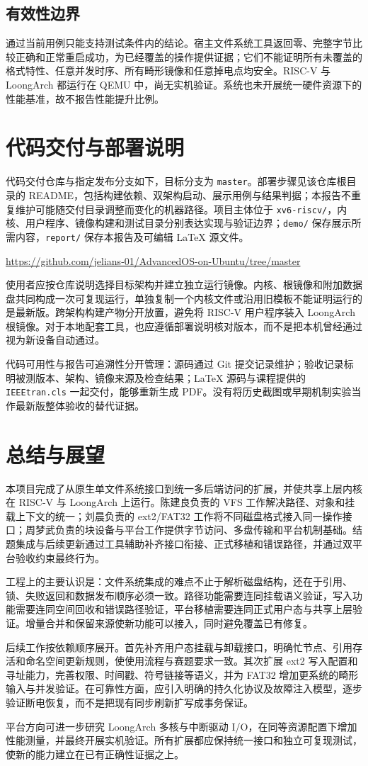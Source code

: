 \documentclass[conference]{IEEEtran}
\newcommand{\code}[1]{\texttt{#1}}
\begin{document}
\subsection{有效性边界}
通过当前用例只能支持测试条件内的结论。宿主文件系统工具返回零、完整字节比较正确和正常重启成功，为已经覆盖的操作提供证据；它们不能证明所有未覆盖的格式特性、任意并发时序、所有畸形镜像和任意掉电点均安全。RISC-V 与 LoongArch 都运行在 QEMU 中，尚无实机验证。系统也未开展统一硬件资源下的性能基准，故不报告性能提升比例。

\section{代码交付与部署说明}
代码交付仓库与指定发布分支如下，目标分支为 \code{master}。部署步骤见该仓库根目录的 README，包括构建依赖、双架构启动、展示用例与结果判据；本报告不重复维护可能随交付目录调整而变化的机器路径。项目主体位于 \code{xv6-riscv/}，内核、用户程序、镜像构建和测试目录分别表达实现与验证边界；\code{demo/} 保存展示所需内容，\code{report/} 保存本报告及可编辑 LaTeX 源文件。

\begin{center}
\small
\url{https://github.com/jelians-01/AdvancedOS-on-Ubuntu/tree/master}
\end{center}

使用者应按仓库说明选择目标架构并建立独立运行镜像。内核、根镜像和附加数据盘共同构成一次可复现运行，单独复制一个内核文件或沿用旧模板不能证明运行的是最新版。跨架构构建产物分开放置，避免将 RISC-V 用户程序装入 LoongArch 根镜像。对于本地配套工具，也应遵循部署说明核对版本，而不是把本机曾经通过视为新设备自动通过。

代码可用性与报告可追溯性分开管理：源码通过 Git 提交记录维护；验收记录标明被测版本、架构、镜像来源及检查结果；LaTeX 源码与课程提供的 \code{IEEEtran.cls} 一起交付，能够重新生成 PDF。没有将历史截图或早期机制实验当作最新版整体验收的替代证据。

\balance
\section{总结与展望}
本项目完成了从原生单文件系统接口到统一多后端访问的扩展，并使共享上层内核在 RISC-V 与 LoongArch 上运行。陈建良负责的 VFS 工作解决路径、对象和挂载上下文的统一；刘晨负责的 ext2/FAT32 工作将不同磁盘格式接入同一操作接口；周梦武负责的块设备与平台工作提供字节访问、多盘传输和平台机制基础。结题集成与后续更新通过工具辅助补齐接口衔接、正式移植和错误路径，并通过双平台验收约束最终行为。

工程上的主要认识是：文件系统集成的难点不止于解析磁盘结构，还在于引用、锁、失败返回和数据发布顺序必须一致。路径功能需要连同挂载语义验证，写入功能需要连同空间回收和错误路径验证，平台移植需要连同正式用户态与共享上层验证。增量合并和保留来源使新功能可以接入，同时避免覆盖已有修复。

后续工作按依赖顺序展开。首先补齐用户态挂载与卸载接口，明确忙节点、引用存活和命名空间更新规则，使使用流程与赛题要求一致。其次扩展 ext2 写入配置和寻址能力，完善权限、时间戳、符号链接等语义，并为 FAT32 增加更系统的畸形输入与并发验证。在可靠性方面，应引入明确的持久化协议及故障注入模型，逐步验证断电恢复，而不是把现有同步刷新扩写成事务保证。

平台方向可进一步研究 LoongArch 多核与中断驱动 I/O，在同等资源配置下增加性能测量，并最终开展实机验证。所有扩展都应保持统一接口和独立可复现测试，使新的能力建立在已有正确性证据之上。
\end{document}
